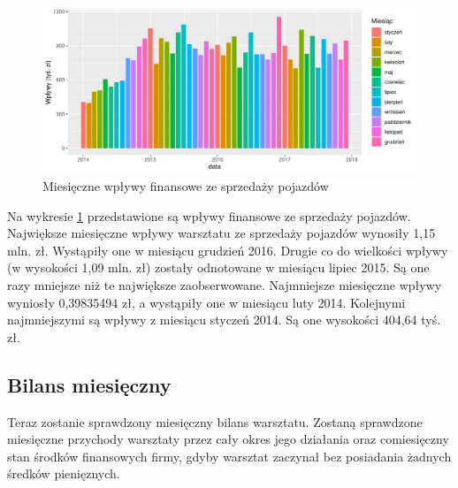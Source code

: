 \documentclass{article}\usepackage[]{graphicx}\usepackage[]{xcolor}
\makeatletter
\def\maxwidth{ %
  \ifdim\Gin@nat@width>\linewidth
    \linewidth
  \else
    \Gin@nat@width
  \fi
}
\newenvironment{knitrout}{}{} %
\makeatother
\begin{document}
\begin{knitrout}
\color{fgcolor}\begin{figure}[H]

{\centering \includegraphics[width=\maxwidth]{figure/fig_samochody_wplywy-1} 

}

\caption[Miesięczne wpływy finansowe ze sprzedaży pojazdów]{Miesięczne wpływy finansowe ze sprzedaży pojazdów}\label{fig:fig_samochody_wplywy}
\end{figure}

\end{knitrout}

Na wykresie \ref{fig:fig_samochody_wplywy} przedstawione są wpływy finansowe ze sprzedaży pojazdów. 
Największe miesięczne wpływy warsztatu ze sprzedaży pojazdów wynosiły 1,15 mln. zł. Wystąpiły one w miesiącu grudzień 2016. 
Drugie co do wielkości wpływy (w wysokości 1,09 mln. zł) zostały odnotowane w miesiącu lipiec 2015. Są one  razy mniejsze niż te największe zaobserwowane.
Najmniejsze miesięczne wpływy wyniosły 0,39835494 zł, a wystąpiły one w miesiącu luty 2014.
Kolejnymi najmniejszymi są wpływy z miesiącu styczeń 2014. Są one wysokości 404,64 tyś. zł.


\subsection{Bilans miesięczny}

Teraz zostanie sprawdzony miesięczny bilans warsztatu. Zostaną sprawdzone miesięczne przychody warsztaty przez cały okres jego działania oraz comiesięczny stan środków finansowych firmy, gdyby warsztat zaczynał bez posiadania żadnych średków pienięznych.
\end{document}
